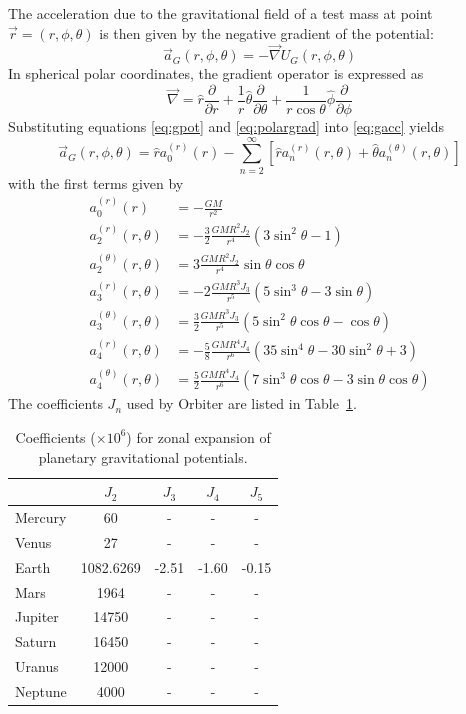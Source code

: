 \documentclass[Orbiter Technical Reference.tex]{subfiles}
\begin{document}
The acceleration due to the gravitational field of a test mass at point $\vec{r} = (r,\phi,\theta)$ is then given by the negative gradient of the potential:
\begin{equation}\label{eq:gacc}
\vec{a}_G(r,\phi,\theta) = -\vec{\nabla} U_G(r,\phi,\theta)
\end{equation}
In spherical polar coordinates, the gradient operator is expressed as
\begin{equation}\label{eq:polargrad}
\vec{\nabla} = \hat{r} \frac{\partial}{\partial r} + \frac{1}{r} \hat{\theta}\frac{\partial}{\partial \theta} + \frac{1}{r \cos\theta}\hat{\phi}\frac{\partial}{\partial\phi}
\end{equation}
Substituting equations \ref{eq:gpot} and \ref{eq:polargrad} into \ref{eq:gacc} yields
\begin{equation}
\vec{a}_G(r,\phi,\theta) = \hat{r} a_0^{(r)}(r) - \sum_{n=2}^\infty \left[ \hat{r} a_n^{(r)}(r,\theta) + \hat{\theta} a_n^{(\theta)}(r,\theta) \right]
\end{equation}
with the first terms given by
\begin{equation}
\begin{split}
a_0^{(r)}(r) &= -\frac{GM}{r^2} \\
a_2^{(r)}(r,\theta) &= -\frac{3}{2} \frac{GMR^2 J_2}{r^4}(3\sin^2\theta - 1)\\
a_2^{(\theta)}(r,\theta) &= 3 \frac{GMR^2 J_2}{r^4} \sin\theta \cos\theta \\
a_3^{(r)}(r,\theta) &= -2 \frac{GMR^3 J_3}{r^5}(5 \sin^3\theta - 3\sin\theta)\\
a_3^{(\theta)}(r,\theta) &= \frac{3}{2} \frac{GMR^3 J_3}{r^5} (5 \sin^2\theta \cos\theta - \cos\theta) \\
a_4^{(r)}(r,\theta) &= -\frac{5}{8} \frac{GMR^4 J_4}{r^6}(35 \sin^4\theta - 30\sin^2\theta + 3) \\
a_4^{(\theta)}(r,\theta) &= \frac{5}{2} \frac{GMR^4 J_4}{r^6} (7 \sin^3\theta \cos\theta - 3 \sin\theta \cos\theta)
\end{split}
\end{equation}
The coefficients $J_n$ used by Orbiter are listed in Table~\ref{tab:Jn}.
\begin{table}
\begin{tabular}{lcccc}
        & $J_2$     & $J_3$ & $J_4$ & $J_5$ \\ \hline
Mercury & 60        & -     & -     & -     \\
Venus   & 27        & -     & -     & -     \\ 
Earth   & 1082.6269 & -2.51 & -1.60 & -0.15 \\
Mars    & 1964      & -     & -     & -     \\
Jupiter & 14750     & -     & -     & -     \\
Saturn  & 16450     & -     & -     & -     \\
Uranus  & 12000     & -     & -     & -     \\
Neptune & 4000      & -     & -     & -
\end{tabular}
\caption{Coefficients ($\times 10^6$) for zonal expansion of planetary gravitational potentials.}
\label{tab:Jn}
\end{table}
\end{document}

